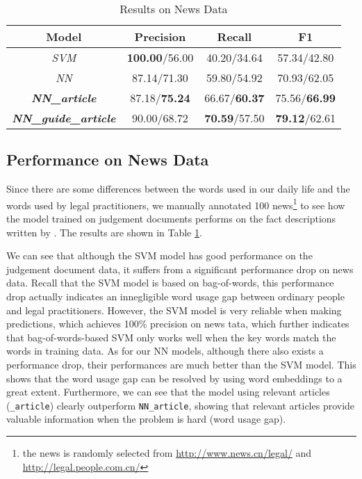 \begin{table}
\centering
\small{
\begin{tabular}{|c|c|c|c|}
\hline
\textbf{Model}												& \textbf{Precision} 				& \textbf{Recall} 				& \textbf{F1} 	\\
\hline
\textit{SVM} 													& \textbf{100.00}/56.00			& 40.20/34.64  						& 57.34/42.80 				 	\\
\hline
\textit{NN}														& 87.14/71.30								& 59.80/54.92 						& 70.93/62.05					\\
\hline
\textbf{\textit{NN\_article}}					& 87.18/\textbf{75.24}			& 66.67/\textbf{60.37} 		& 75.56/\textbf{66.99}					\\
\hline
\textbf{\textit{NN\_guide\_article}} 	& 90.00/68.72 							& \textbf{70.59}/57.50 		& \textbf{79.12}/62.61 		 	\\
\hline
\end{tabular}
}
\caption{Results on News Data}
\label{tabble_news_results}
\end{table}


\subsection{Performance on News Data}
Since there are some differences between the words used in our daily life and the words used by legal practitioners, we manually annotated 100 news\footnote{the news is randomly selected from \url{http://www.news.cn/legal/} and \url{http://legal.people.com.cn/}} to see how the model trained on judgement documents performs on the fact descriptions written by . The results are shown in Table \ref{tabble_news_results}.

We can see that although the SVM model has good performance on the judgement document data, it suffers from a significant performance drop on news data.
Recall that the SVM model is based on bag-of-words, this performance drop actually indicates an innegligible word usage gap between ordinary people and legal practitioners. However, the SVM model is very reliable when making predictions, which achieves 100\% precision on news tata, which further indicates that bag-of-words-based SVM only works well when the key words match the words in training data.
As for our NN models, although there also exists a performance drop, their performances are much better than the SVM model. This shows that the word usage gap can be resolved by using word embeddings to a great extent. Furthermore, we can see that the model using relevant articles (\texttt{\_article}) clearly outperform \texttt{NN\_article}, showing that relevant articles provide valuable information when the problem is hard (word usage gap).

